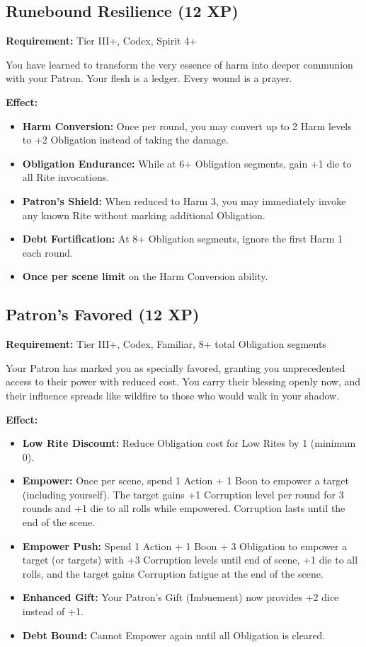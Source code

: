 \subsection{Runebound Resilience (12 XP)}

\textbf{Requirement:} Tier III+, Codex, Spirit 4+

You have learned to transform the very essence of harm into deeper communion with your Patron. Your flesh is a ledger. Every wound is a prayer.

\textbf{Effect:}
\begin{itemize}
\item \textbf{Harm Conversion:} Once per round, you may convert up to 2 Harm levels to +2 Obligation instead of taking the damage.
\item \textbf{Obligation Endurance:} While at 6+ Obligation segments, gain +1 die to all Rite invocations.
\item \textbf{Patron's Shield:} When reduced to Harm 3, you may immediately invoke any known Rite without marking additional Obligation.
\item \textbf{Debt Fortification:} At 8+ Obligation segments, ignore the first Harm 1 each round.
\item \textbf{Once per scene limit} on the Harm Conversion ability.
\end{itemize}

\subsection{Patron's Favored (12 XP)}

\textbf{Requirement:} Tier III+, Codex, Familiar, 8+ total Obligation segments

Your Patron has marked you as specially favored, granting you unprecedented access to their power with reduced cost. You carry their blessing openly now, and their influence spreads like wildfire to those who would walk in your shadow.

\textbf{Effect:}
\begin{itemize}
\item \textbf{Low Rite Discount:} Reduce Obligation cost for Low Rites by 1 (minimum 0).
\item \textbf{Empower:} Once per scene, spend 1 Action + 1 Boon to empower a target (including yourself). The target gains +1 Corruption level per round for 3 rounds and +1 die to all rolls while empowered. Corruption lasts until the end of the scene.
\item \textbf{Empower Push:} Spend 1 Action + 1 Boon + 3 Obligation to empower a target (or targets) with +3 Corruption levels until end of scene, +1 die to all rolls, and the target gains Corruption fatigue at the end of the scene.
\item \textbf{Enhanced Gift:} Your Patron's Gift (Imbuement) now provides +2 dice instead of +1.
\item \textbf{Debt Bound:} Cannot Empower again until all Obligation is cleared.
\end{itemize}

